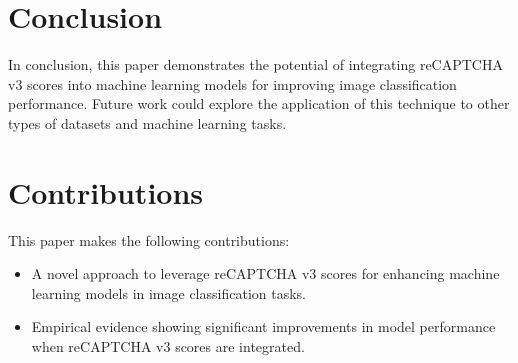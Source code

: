 \documentclass{article}
\begin{document}
\section{Conclusion}
In conclusion, this paper demonstrates the potential of integrating reCAPTCHA v3 scores into machine learning models for improving image classification performance. Future work could explore the application of this technique to other types of datasets and machine learning tasks.

\section{Contributions}
This paper makes the following contributions:
\begin{itemize}
    \item A novel approach to leverage reCAPTCHA v3 scores for enhancing machine learning models in image classification tasks.
    \item Empirical evidence showing significant improvements in model performance when reCAPTCHA v3 scores are integrated.
\end{itemize}
\end{document}
